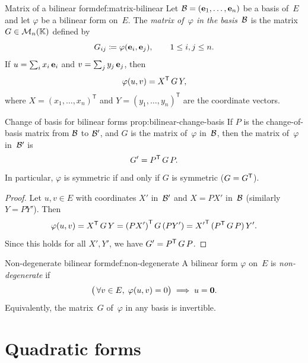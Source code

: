\begin{definition}{Matrix of a bilinear form}{def:matrix-bilinear}
Let ${\mathcal{B}} = (\mathbf{e}_{1},\ldots,\mathbf{e}_{n})$ be a basis of~$E$ and let
$\varphi$ be a bilinear form on~$E$.  The \emph{matrix of~$\varphi$
in the basis~${\mathcal{B}}$} is the matrix $G\in\mathcal{M}_n({\mathbb{K}})$ defined by
\[
  G_{ij} \coloneqq \varphi(\mathbf{e}_{i},\mathbf{e}_{j}),
  \qquad 1\leq i,j\leq n.
\]
If $u = \sum_i x_i\,\mathbf{e}_{i}$ and $v = \sum_j y_j\,\mathbf{e}_{j}$, then
\[
  \varphi(u,v) = {X}^{\mathsf{T}}\, G\, Y,
\]
where $X = (x_1,\ldots,x_n)^{\mathsf{T}}$ and
$Y = (y_1,\ldots,y_n)^{\mathsf{T}}$ are the coordinate vectors.
\end{definition}

\begin{proposition}{Change of basis for bilinear forms}%
{prop:bilinear-change-basis}
If $P$ is the change-of-basis matrix from ${\mathcal{B}}$ to ${\mathcal{B}}'$, and $G$ is
the matrix of~$\varphi$ in~${\mathcal{B}}$, then the matrix of~$\varphi$
in~${\mathcal{B}}'$ is
\[
  G' = {P}^{\mathsf{T}}\, G\, P.
\]
In particular, $\varphi$ is symmetric if and only if $G$ is symmetric
($G = {G}^{\mathsf{T}}$).
\end{proposition}

\begin{proof}
Let $u,v\in E$ with coordinates $X'$ in~${\mathcal{B}}'$ and $X = PX'$ in~${\mathcal{B}}$
(similarly $Y = PY'$).  Then
\[
  \varphi(u,v) = {X}^{\mathsf{T}}\, G\, Y
    = {(PX')}^{\mathsf{T}}\, G\, (PY')
    = {X'}^{\mathsf{T}}\,({P}^{\mathsf{T}}\, G\, P)\, Y'.
\]
Since this holds for all $X', Y'$, we have $G' = {P}^{\mathsf{T}}\, G\, P$.
\end{proof}

\begin{definition}{Non-degenerate bilinear form}{def:non-degenerate}
A bilinear form $\varphi$ on~$E$ is \emph{non-degenerate} if
\[
  \bigl(\,\forall v\in E,\;\varphi(u,v) = 0\bigr)
  \;\Longrightarrow\; u = \mathbf{0}.
\]
Equivalently, the matrix~$G$ of~$\varphi$ in any basis is invertible.
\end{definition}


\section{Quadratic forms}\label{sec:quadratic-forms}

